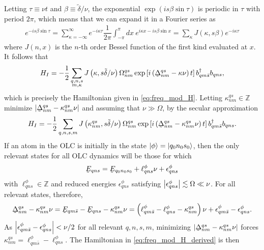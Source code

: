 \documentclass[aps,notitlepage,nofootinbib,11pt]{revtex4-1}
\newcommand{\f}[2]{\dfrac{#1}{#2}} %
\newcommand{\p}[1]{\left(#1\right)} %
\renewcommand{\sp}[1]{\left[#1\right]} %
\newcommand{\1}{\mathds{1}}
\newcommand{\Z}{\mathbb Z}
\newcommand{\utilde}[1]{\underaccent{\tilde}{#1}}
\begin{document}
Letting $\tau\equiv\nu t$ and $\beta\equiv\tilde\delta/\nu$, the
exponential $\exp\p{is\beta\sin\tau}$ is periodic in $\tau$ with
period $2\pi$, which means that we can expand it in a Fourier series
as
\begin{align}
  e^{-is\beta\sin\tau}
  = \sum_{\kappa=-\infty}^\infty e^{-i\kappa\tau}\f1{2\pi}
  \int_{-\pi}^\pi dx~ e^{i\kappa x - is\beta\sin x}
  = \sum_\kappa J\p{\kappa,s\beta} e^{-i\kappa\tau}
\end{align}
where $J\p{n,x}$ is the $n$-th order Bessel function of the first kind
evaluated at $x$. It follows that
\begin{align}
  H_I
  = -\f12\sum_{\substack{q,n,s\\m,\kappa}}
  J\p{\kappa,s\tilde\delta/\nu} \Omega^{qs}_{nm}
  \exp\sp{i\p{\utilde\Delta^{qs}_{nm}-\kappa\nu}t}
  b_{qm\bar s}^\dag b_{qns},
\end{align}
which is precisely the Hamiltonian given in
\eqref{eq:freq_mod_H}. Letting $\kappa^{qs}_{nm}\in\Z$ minimize
$\abs{\utilde\Delta^{qs}_{nm}-\kappa^{qs}_{nm}\nu}$ and assuming that
$\nu\gg\Omega$, by the secular approximation
\begin{align}
  H_I
  = -\f12\sum_{q,n,s,m}
  J\p{\kappa^{qs}_{nm},s\tilde\delta/\nu} \Omega^{qs}_{nm}
  \exp\sp{i\p{\utilde\Delta^{qs}_{nm}-\kappa^{qs}_{nm}\nu}t}
  b_{qm\bar s}^\dag b_{qns}.
  \label{eq:freq_mod_H_derived}
\end{align}
If an atom in the OLC is initially in the state
$\ket\phi=\ket{q_0n_0s_0}$, then the only relevant states for all OLC
dynamics will be those for which
\begin{align}
  \utilde E_{qns}
  = \utilde E_{q_0n_0s_0} + \ell_{qns}^\phi\nu + \epsilon_{qns}^\phi
  \label{eq:relevant_condition}
\end{align}
with $\ell_{qns}^\phi\in\Z$ and reduced energies $\epsilon_{qns}^\phi$
satisfying $\abs{\epsilon_{qns}^\phi}\lesssim\Omega\ll\nu$. For all
relevant states, therefore,
\begin{align}
  \utilde\Delta^{qs}_{nm} - \kappa^{qs}_{nm}\nu
  = \utilde E_{qm\bar s} - \utilde E_{qns} - \kappa^{qs}_{nm}\nu
  = \p{\ell_{qm\bar s}^\phi - \ell_{qns}^\phi - \kappa^{qs}_{nm}}\nu
  + \epsilon_{qm\bar s}^\phi - \epsilon_{qns}^\phi.
\end{align}
As $\abs{\epsilon_{qm\bar s}^\phi-\epsilon_{qns}^\phi}<\nu/2$ for all
relevant $q,n,s,m$, minimizing
$\abs{\utilde\Delta^{qs}_{nm}-\kappa^{qs}_{nm}\nu}$ forces
$\kappa^{qs}_{nm}=\ell_{qm\bar s}^\phi-\ell_{qns}^\phi$. The
Hamiltonian in \eqref{eq:freq_mod_H_derived} is then
\end{document}
